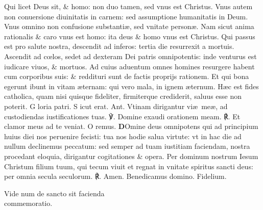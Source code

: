 \documentclass[a5paper,10pt]{book}
\def\Vbar{℣}
\def\Rbar{℟}
\def\ae{æ}
\def\oe{œ}
\begin{document}
\begin{multicols*}{2}
\newline \color{red} Q\color{black}ui licet Deus sit, \& homo: non duo tamen, sed vnus est Christus.
\newline \color{red} V\color{black}nus autem non conuersione diuinitatis in carnem: sed assumptione humanitatis in Deum.
\newline \color{red} V\color{black}nus omnino non confusione substanti\ae , sed vnitate person\ae .
\newline \color{red} N\color{black}am sicut anima rationalis \& caro vnus est homo: ita deus \& homo vnus est Christus.
\newline \color{red} Q\color{black}ui passus est pro salute nostra, descendit ad inferos: tertia die resurrexit a mortuis.
\newline \color{red} A\color{black}scendit ad c\oe los, sedet ad dexteram Dei patris omnipotentis: inde venturus est iudicare viuos, \& mortuos.
\newline \color{red} A\color{black}d cuius aduentum omnes homines resurgere habent cum corporibus suis: \& reddituri sunt de factis proprijs rationem.
\newline \color{red} E\color{black}t qui bona egerunt ibunt in vitam \ae ternam: qui vero mala, in ignem \ae ternum.
\newline \color{red} H\color{black}\ae c est fides catholica, quam nisi quisque fideliter, firmiterque crediderit, saluus esse non poterit.
\newline \color{red} G\color{black} loria patri. \color{red} S\color{black} icut erat. \color{red} Ant. \color{black} Vtinam dirigantur vi\ae \ me\ae , ad custodiendas iustificationes tuas. \color{red} \Vbar . \color{black} Domine exaudi orationem meam. \color{red} \Rbar . \color{black} Et clamor meus ad te veniat. \quad \color{red} O\color{black} remus.
\lettrine[lines=2]{\bfseries \color{red} D}{}Omine deus omnipotens qui ad principium huius diei nos peruenire fecisti: tua nos hodie salua virtute: vt in hac die ad nullum declinemus peccatum: sed semper ad tuam iustitiam faciendam, nostra procedant eloquia, dirigantur cogitationes \& opera. Per dominum nostrum Iesum Christum filium tuum, qui tecum viuit et regnat in vnitate spiritus sancti deus: per omnia secula seculorum. \color{red} \Rbar . \color{black} Amen. Benedicamus domino. Fidelium.
\vspace{-1em}
\begin{center} \color{red}
Vide num de sancto sit facienda\\commemoratio.

\end{center}
\end{multicols*}
\end{document}
